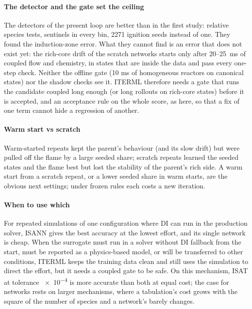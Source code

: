 \documentclass[preprint,review,12pt]{elsarticle}
\begin{document}
\paragraph{The detector and the gate set the ceiling} The detectors of the present loop are better than in the
first study: relative species tests, sentinels in every bin, 2271 ignition seeds instead of one. They found
the induction-zone error. What they cannot find is an error that does not exist yet: the rich-core drift of
the scratch networks starts only after 20--25~ms of coupled flow and chemistry, in states that are inside the
data and pass every one-step check. Neither the offline gate (10 ms of homogeneous reactors on canonical
states) nor the shadow checks see it. ITERML therefore needs a gate that runs the candidate coupled long
enough (or long rollouts on rich-core states) before it is accepted, and an acceptance rule on the whole
score, as here, so that a fix of one term cannot hide a regression of another.

\paragraph{Warm start vs scratch} Warm-started repeats kept the parent's behaviour (and its slow drift) but were
pulled off the flame by a large seeded share; scratch repeats learned the seeded states and the flame best but
lost the stability of the parent's rich side. A warm start from a scratch repeat, or a lower seeded share in
warm starts, are the obvious next settings; under frozen rules each costs a new iteration.

\paragraph{When to use which} For repeated simulations of one configuration where DI can run in the
production solver, ISANN gives the best accuracy at the lowest effort, and its single network is cheap. When
the surrogate must run in a solver without DI fallback from the start, must be reported as a physics-based
model, or will be transferred to other conditions, ITERML keeps the training data clean and still uses the
simulation to direct the effort, but it needs a coupled gate to be safe. On this mechanism, ISAT at tolerance
\num{e-4} is more accurate than both at equal cost; the case for networks rests on larger mechanisms, where a
tabulation's cost grows with the square of the number of species and a network's barely changes.
\end{document}
